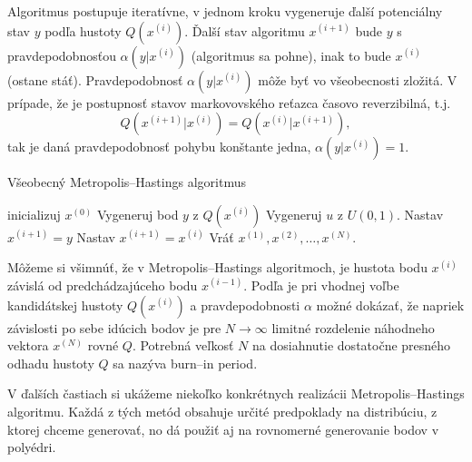Algoritmus postupuje iteratívne, v jednom kroku vygeneruje ďalší potenciálny stav $y$ podľa hustoty $Q(x^{(i)})$. Ďalší stav algoritmu $x^{(i+1)}$ bude $y$ s pravdepodobnosťou $\alpha (y|x^{(i)})$ (algoritmus sa pohne), inak to bude $x^{(i)}$ (ostane stáť).
Pravdepodobnosť $\alpha (y|x^{(i)})$ môže byť vo všeobecnosti zložitá. V prípade, že je postupnosť stavov markovovského reťazca časovo reverzibilná, t.j. $$Q(x^{(i+1)}|x^{(i)})=Q(x^{(i)}|x^{(i+1)}),$$ tak je daná pravdepodobnosť pohybu konštante jedna, $\alpha (y|x^{(i)})=1$.

\begin{algorithm}[H]
	\caption{Všeobecný Metropolis--Hastings algoritmus \cite{metropolis-hastings_chib}}
	\label{metropolis-hastings}
	\begin{algorithmic}[1]
		\State inicializuj $x^{(0)}$
			\State Vygeneruj bod $y$ z $Q(x^{(i)})$
			\State Vygeneruj $u$ z $U(0,1)$.
				\State Nastav $x^{(i+1)}=y$
			\Else
				\State Nastav $x^{(i+1)}=x^{(i)}$
			\EndIf
		\EndFor
		\State Vráť ${x^{(1)},x^{(2)},\dots,x^{(N)}}$.
	\end{algorithmic}
\end{algorithm}

Môžeme si všimnúť, že v Metropolis--Hastings algoritmoch, je hustota bodu $x^{(i)}$ závislá od predchádzajúceho bodu $x^{(i-1)}$. Podľa \cite{metropolis-hastings_chib} je pri vhodnej voľbe kandidátskej hustoty $Q(x^{(i)})$ a pravdepodobnosti $\alpha$ možné dokázať, že napriek závislosti po sebe idúcich bodov je pre $N \rightarrow \infty$ limitné rozdelenie náhodneho vektora $x^{(N)}$ rovné $Q$. Potrebná veľkosť $N$ na dosiahnutie dostatočne presného odhadu hustoty $Q$ sa nazýva burn--in period.

V ďalších častiach si ukážeme niekoľko konkrétnych realizácii Metropolis--Hastings algoritmu. Každá z tých metód obsahuje určité predpoklady na distribúciu, z ktorej chceme generovať, no dá použiť aj na rovnomerné generovanie bodov v polyédri.